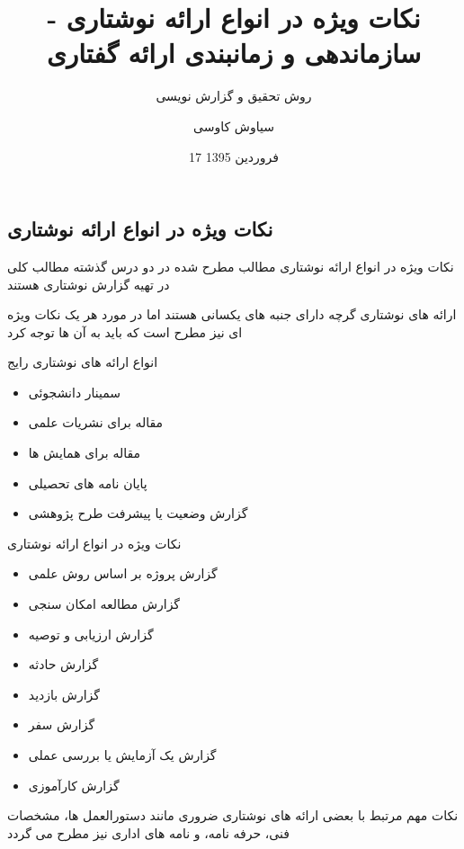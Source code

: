 \documentclass[14pt]{beamer}
\title{نکات ویژه در انواع ارائه نوشتاری - سازماندهی و زمانبندی ارائه گفتاری}
\subtitle{\color{brown} روش تحقیق و گزارش نویسی}
\date{17 فروردین 1395}
\author{سیاوش کاوسی}
\institute{دانشگاه صنعتی امیرکبیر}
\makeatletter
\newcommand{\rtlist}{\raggedleft\rightskip\@totalleftmargin}
\newcommand{\sectionfontsize}{\fontsize{22pt}{0pt}\selectfont}
\newcommand{\framefontsizelarge}{\fontsize{18pt}{0pt}\selectfont}
\newcommand{\frametitlefontsize}{\fontsize{20pt}{0pt}\selectfont}
\makeatother
\begin{document}
\begin{persian}
	\maketitle
	\everypar{\rightskip\rightmargin}		
	
	\section{\sectionfontsize نکات ویژه در انواع ارائه نوشتاری}	
	
	\begin{frame}[plain]{\frametitlefontsize نکات ویژه در انواع ارائه نوشتاری}
		\framefontsizelarge
		مطالب مطرح شده در دو درس گذشته مطالب کلی در تهیه گزارش نوشتاری هستند
		
		ارائه های نوشتاری گرچه دارای جنبه های یکسانی هستند اما در مورد هر یک نکات ویژه ای نیز مطرح است که باید به آن ها توجه کرد
		
		انواع ارائه های نوشتاری رایج
		\begin{itemize}\rtlist
			\item سمینار دانشجوئی
			\item مقاله برای نشریات علمی
			\item مقاله برای همایش ها
			\item پایان نامه های تحصیلی
			\item گزارش وضعیت یا پیشرفت طرح پژوهشی
		\end{itemize}
	\end{frame}	
	
	\begin{frame}[plain]{\frametitlefontsize نکات ویژه در انواع ارائه نوشتاری}
		\framefontsizelarge
		\begin{itemize}\rtlist
			\item گزارش پروژه بر اساس روش علمی
			\item گزارش مطالعه امکان سنجی
			\item گزارش ارزیابی و توصیه
			\item گزارش حادثه
			\item گزارش بازدید
			\item گزارش سفر
			\item گزارش یک آزمایش یا بررسی عملی
			\item گزارش کارآموزی
		\end{itemize}
		\persian
		نکات مهم مرتبط با بعضی ارائه های نوشتاری ضروری مانند دستورالعمل ها، مشخصات فنی، حرفه نامه، و نامه های اداری نیز مطرح می گردد
	\end{frame}	


\end{persian}
\end{document}
